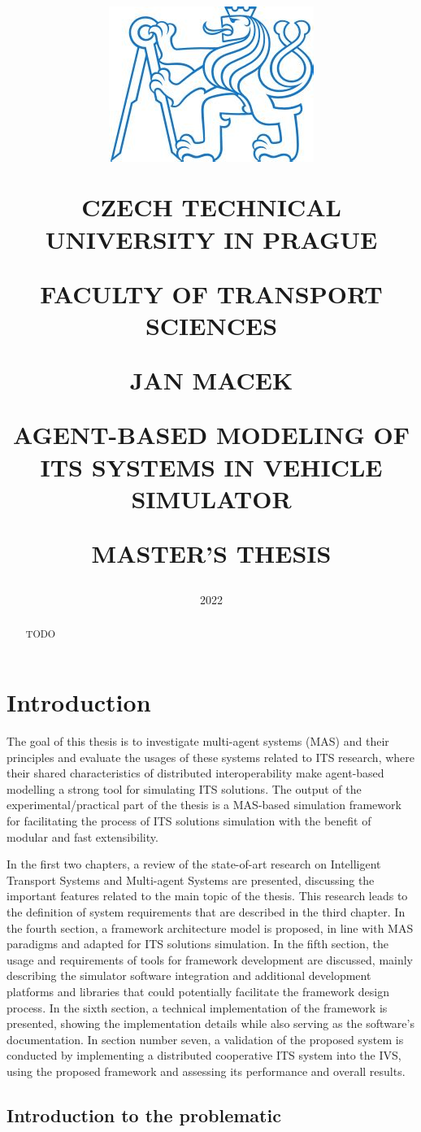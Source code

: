 \documentclass[titlepage, 12pt]{article}
\title{
\includegraphics[width=.3\textwidth]{cvut-logo.jpg}\par
\vspace{10mm}
\indent
\textbf{CZECH TECHNICAL UNIVERSITY IN PRAGUE}

FACULTY OF TRANSPORT SCIENCES

\vfill

{\Large JAN MACEK}
\vspace{10mm}

AGENT-BASED MODELING OF ITS SYSTEMS IN VEHICLE SIMULATOR 
\vspace{15mm}

{\Large MASTER'S THESIS}
\vfill

}
\date{\Large 2022}
\begin{document}
\setlength{\baselineskip}{1.5em}
\maketitle



\begin{abstract}
    TODO
\end{abstract}

\tableofcontents
\newpage

\section{Introduction}

The goal of this thesis is to investigate multi-agent systems (MAS) and their principles and evaluate the usages of these systems related to ITS research, where 
their shared characteristics of distributed interoperability make
agent-based modelling a strong tool for simulating ITS solutions. The output of 
the experimental/practical part of the thesis is a MAS-based simulation framework 
for facilitating the process of ITS solutions simulation with the benefit 
of modular and fast extensibility.

In the first two chapters, a review of the state-of-art research on Intelligent 
Transport Systems and Multi-agent Systems are presented, discussing the important 
features related to the main topic of the thesis. This research leads to the definition of system
requirements that are described in the third chapter. In the 
fourth section, a framework architecture model is proposed, in line with 
MAS paradigms and adapted for ITS solutions simulation. In the fifth section, the
usage and requirements of tools for framework development are discussed, mainly describing the simulator software integration
and additional development platforms and libraries that could potentially facilitate the
framework design process. In the sixth section, a technical implementation of the 
framework is presented, showing the implementation details while also serving as the 
software's documentation. In section number seven, a validation of the proposed 
system is conducted by implementing a distributed cooperative ITS system into the
IVS, using the proposed framework and assessing its performance and overall results.

\subsection{Introduction to the problematic}
\end{document}
